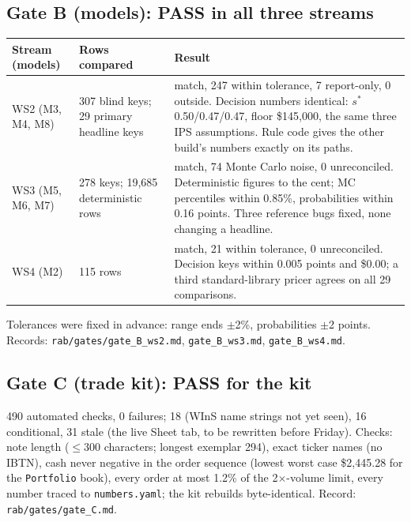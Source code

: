 \subsection*{Gate B (models): PASS in all three streams}
\begin{center}
\begin{tabularx}{\textwidth}{>{\raggedright}p{2.5cm}>{\raggedright}p{3.0cm}>{\raggedright\arraybackslash}X}
\toprule
Stream (models) & Rows compared & Result \\
\midrule
WS2 (M3, M4, M8) & 307 blind keys; 29 primary headline keys & 53 match, 247 within tolerance, 7 report-only, 0 outside. Decision numbers identical: $s^*$ 0.50/0.47/0.47, floor \$145,000, the same three IPS assumptions. Rule code gives the other build's numbers exactly on its paths. \\
WS3 (M5, M6, M7) & 278 keys; 19,685 deterministic rows & 204 match, 74 Monte Carlo noise, 0 unreconciled. Deterministic figures to the cent; MC percentiles within 0.85\%, probabilities within 0.16 points. Three reference bugs fixed, none changing a headline. \\
WS4 (M2) & 115 rows & 94 match, 21 within tolerance, 0 unreconciled. Decision keys within 0.005 points and \$0.00; a third standard-library pricer agrees on all 29 comparisons. \\
\bottomrule
\end{tabularx}
\end{center}
Tolerances were fixed in advance: range ends $\pm$2\%, probabilities $\pm$2 points. Records:
\texttt{rab/gates/gate\_B\_ws2.md}, \texttt{gate\_B\_ws3.md}, \texttt{gate\_B\_ws4.md}.

\subsection*{Gate C (trade kit): PASS for the kit}
490 automated checks, 0 failures; 18 \UNV{} (WInS name strings not yet seen), 16 conditional, 31 stale (the live
Sheet tab, to be rewritten before Friday). Checks: note length ($\le$300 characters; longest exemplar 294), exact
ticker names (no IBTN), cash never negative in the order sequence (lowest worst case \$2,445.28 for the
\texttt{Portfolio} book), every order at most 1.2\% of the 2$\times$-volume limit, every number traced to
\texttt{numbers.yaml}; the kit rebuilds byte-identical. Record: \texttt{rab/gates/gate\_C.md}.

